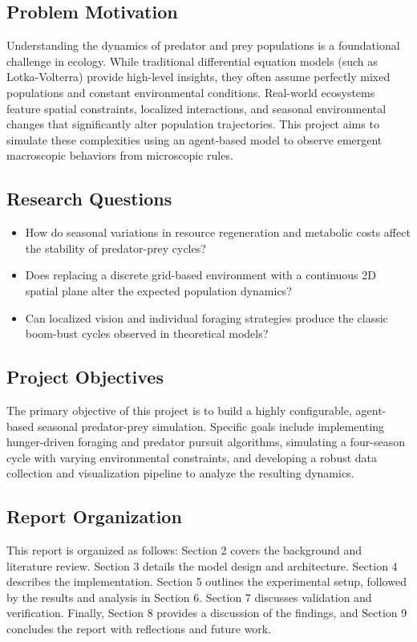 \documentclass[12pt]{article}
\begin{document}
\subsection{Problem Motivation}
Understanding the dynamics of predator and prey populations is a foundational challenge in ecology. While traditional differential equation models (such as Lotka-Volterra) provide high-level insights, they often assume perfectly mixed populations and constant environmental conditions. Real-world ecosystems feature spatial constraints, localized interactions, and seasonal environmental changes that significantly alter population trajectories. This project aims to simulate these complexities using an agent-based model to observe emergent macroscopic behaviors from microscopic rules.

\subsection{Research Questions}
\begin{itemize}
    \item How do seasonal variations in resource regeneration and metabolic costs affect the stability of predator-prey cycles?
    \item Does replacing a discrete grid-based environment with a continuous 2D spatial plane alter the expected population dynamics?
    \item Can localized vision and individual foraging strategies produce the classic boom-bust cycles observed in theoretical models?
\end{itemize}

\subsection{Project Objectives}
The primary objective of this project is to build a highly configurable, agent-based seasonal predator-prey simulation. Specific goals include implementing hunger-driven foraging and predator pursuit algorithms, simulating a four-season cycle with varying environmental constraints, and developing a robust data collection and visualization pipeline to analyze the resulting dynamics.

\subsection{Report Organization}
This report is organized as follows: Section 2 covers the background and literature review. Section 3 details the model design and architecture. Section 4 describes the implementation. Section 5 outlines the experimental setup, followed by the results and analysis in Section 6. Section 7 discusses validation and verification. Finally, Section 8 provides a discussion of the findings, and Section 9 concludes the report with reflections and future work.
\end{document}
